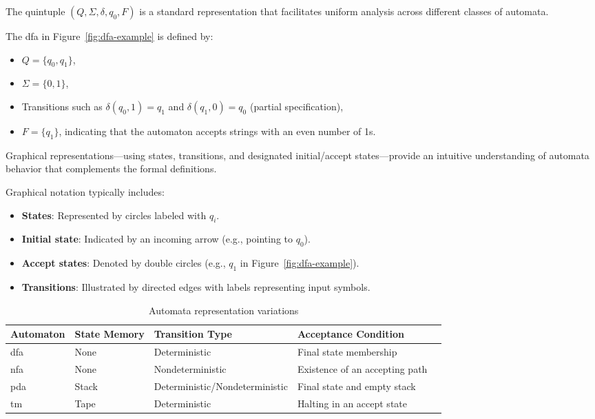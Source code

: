 \begin{remark}
The quintuple $(Q, \Sigma, \delta, q_0, F)$ is a standard representation that facilitates uniform analysis across different classes of automata.
\end{remark}

\begin{example}
The \gls{dfa} in Figure~\ref{fig:dfa-example} is defined by:
\begin{itemize}
    \item $Q = \{q_0, q_1\}$,
    \item $\Sigma = \{0, 1\}$,
    \item Transitions such as $\delta(q_0, 1) = q_1$ and $\delta(q_1, 0) = q_0$ (partial specification),
    \item $F = \{q_1\}$, indicating that the automaton accepts strings with an even number of 1s.
\end{itemize}
\end{example}

\begin{observation}
Graphical representations—using states, transitions, and designated initial/accept states—provide an intuitive understanding of automata behavior that complements the formal definitions.
\end{observation}

Graphical notation typically includes:
\begin{itemize}
    \item \textbf{States}: Represented by circles labeled with $q_i$.
    \item \textbf{Initial state}: Indicated by an incoming arrow (e.g., pointing to $q_0$).
    \item \textbf{Accept states}: Denoted by double circles (e.g., $q_1$ in Figure~\ref{fig:dfa-example}).
    \item \textbf{Transitions}: Illustrated by directed edges with labels representing input symbols.
\end{itemize}

\begin{table}[htbp]
    \centering
    \begin{adjustbox}{max width=\textwidth}
      \begin{tabular}{@{}lllll@{}}
          \toprule
          \textbf{Automaton} & \textbf{State Memory} & \textbf{Transition Type} & \textbf{Acceptance Condition} \\ \midrule
          \gls{dfa} & None & Deterministic & Final state membership \cite{hopcroft2006introduction} \\
          \gls{nfa} & None & Nondeterministic & Existence of an accepting path \cite{hopcroft2006introduction} \\
          \gls{pda} & Stack & Deterministic/Nondeterministic & Final state and empty stack \cite{chomsky1956three} \\
          \gls{tm} & Tape & Deterministic & Halting in an accept state \cite{turing1936computable} \\
          \bottomrule
      \end{tabular}
    \end{adjustbox}
    \caption{Automata representation variations}
    \label{tab:automata-variations}
\end{table}
